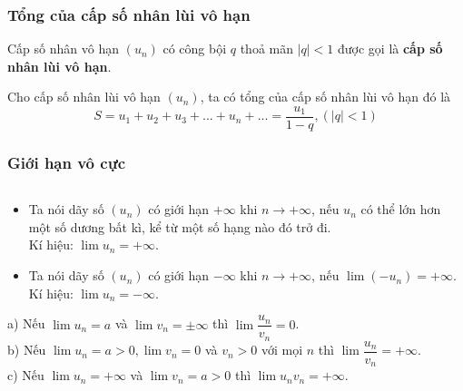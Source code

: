 \subsubsection{Tổng của cấp số nhân lùi vô hạn}
\begin{dn}
	Cấp số nhân vô hạn $(u_n)$ có công bội $q$ thoả mãn $|q|<1$ được gọi là \textbf{cấp số nhân lùi vô hạn}.
\end{dn}

\begin{dl}
Cho cấp số nhân lùi vô hạn $(u_n)$, ta có tổng của cấp số nhân lùi vô hạn đó là $$S=u_1+u_2+u_3+...+u_n+...=\dfrac{u_1}{1-q}, (|q|<1)$$
\end{dl}

\subsubsection{Giới hạn vô cực}
\begin{dn} $\textrm{ }$\\	
\begin{itemize}
\item  Ta nói dãy số $(u_n)$ có giới hạn $+\infty$ khi $n\to +\infty$, nếu $u_n$ có thể lớn hơn một số dương bất kì, kể từ một số hạng nào đó trở đi.\\
Kí hiệu: $\lim u_n=+\infty$.
\item  Ta nói dãy số $(u_n)$ có giới hạn $-\infty$ khi $n\to +\infty$, nếu $\lim (-u_n)=+\infty$.\\
Kí hiệu: $\lim u_n=-\infty$.
\end{itemize}
\end{dn}

\begin{dl} $\textrm{ }$\\
	a) Nếu $\lim u_n=a$ và $\lim v_n=\pm \infty$ thì $\lim\dfrac{u_n}{v_n}=0$.\\
	b) Nếu $\lim u_n=a>0, \lim v_n=0$ và $v_n>0$ với mọi $n$ thì $\lim\dfrac{u_n}{v_n}=+\infty$.\\
	c) Nếu $\lim u_n=+\infty$ và $\lim v_n=a>0$ thì $\lim u_nv_n=+\infty$.
\end{dl}

